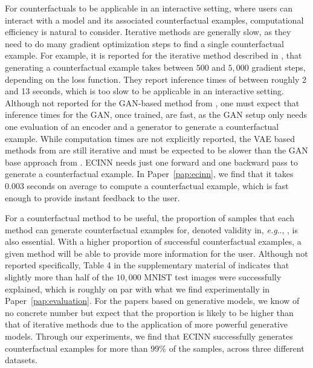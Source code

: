 \documentclass[11pt,a4paper,twoside,openright,final]{memoir}
\makeatletter
\DeclareRobustCommand\onedot{\futurelet\@let@token\@onedot}
\def\@onedot{\ifx\@let@token.\else.\null\fi\xspace}
\def\eg{\emph{e.g}\onedot} \def\Eg{\emph{E.g}\onedot}
\newcommand*{\paperref}[1]{Paper~\hyperref[#1]{\ref{#1}}}
\makeatother
\begin{document}
For counterfactuals to be applicable in an interactive setting, where users can interact with a model and its associated counterfactual examples, computational efficiency is natural to consider.
Iterative methods are generally slow, as they need to do many gradient optimization steps to find a single counterfactual example.
For example, it is reported for the iterative method described in \cite{VanLooveren2019}, that generating a counterfactual example takes between $500$ and $5,000$ gradient steps, depending on the loss function. 
They report inference times of between roughly 2 and 13 seconds, which is too slow to be applicable in an interactive setting.
Although not reported for the GAN-based method from \cite{Singla2019}, one must expect that inference times for the GAN, once trained, are fast, as the GAN setup only needs one evaluation of an encoder and a generator to generate a counterfactual example.
While computation times are not explicitly reported, the VAE based methods from \cite{Rodriguez2021, Joshi2018} are still iterative and must be expected to be slower than the GAN base approach from \cite{Singla2019}.
ECINN needs just one forward and one backward pass to generate a counterfactual example.
In \paperref{pap:ecinn}, we find that it takes $0.003$ seconds on average to compute a counterfactual example, which is fast enough to provide instant feedback to the user.

For a counterfactual method to be useful, the proportion of samples that each method can generate counterfactual examples for, denoted validity in, \eg, \cite{Mothilal2020}, is also essential.
With a higher proportion of successful counterfactual examples, a given method will be able to provide more information for the user.
Although not reported specifically, Table 4 in the supplementary material of \citet{VanLooveren2019} indicates that slightly more than half of the $10,000$ MNIST test images were successfully explained, which is roughly on par with what we find experimentally in \paperref{pap:evaluation}.
For the papers based on generative models, we know of no concrete number but expect that the proportion is likely to be higher than that of iterative methods due to the application of more powerful generative models. 
Through our experiments, we find that ECINN successfully generates counterfactual examples for more than 99\% of the samples, across three different datasets. 
\end{document}
